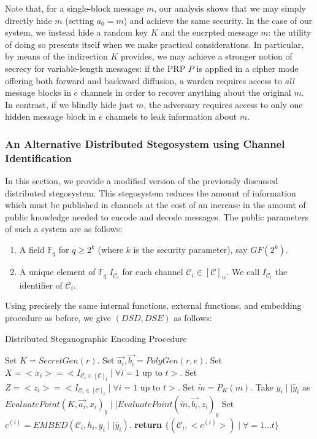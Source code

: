 \documentclass{article}
\begin{document}
Note that, for a single-block message $m$, our analysis shows that we may simply directly hide $m$ (setting $a_0 = m$) and achieve 
the same security.  In the case of our system, we instead hide a random key $K$ and the encrpted message $m$: the utility of doing so 
presents itself when we make practical considerations.  In particular, by means of the indirection $K$ provides, we may achieve a 
stronger notion of  secrecy for variable-length messages: if the PRP $P$ is applied in a cipher mode offering both forward and backward diffusion, 
a warden requires access to \textit{all} message blocks in $e$ channels in order to recover anything about the original $m$.  In contrast,
if we blindly hide just $m$, the adversary requires access to only one hidden message block in $e$ channels to leak information about $m$.

\subsubsection{An Alternative Distributed Stegosystem using Channel Identification}

In this section, we provide a modified version of the previously discussed distributed stegosystem.
This stegosystem reduces the amount of information which must be published in channels at the cost 
of an increase in the amount of public knowledge needed to encode and decode messages.
\newline\newline
The public parameters of such a system are as follows:
\begin{enumerate}
\item{A field $\mathbb{F}_q$ for $q \geq 2^k$ (where $k$ is the security parameter), say $GF(2^k)$.}
\item{A unique element of $\mathbb{F}_q$ $I_{\mathcal{C}_i}$ for each channel $\mathcal{C}_i \in [\mathcal{C}]_w$.  We call $I_{\mathcal{C}_i}$ the identifier of $\mathcal{C}_i$.}
\end{enumerate}

Using precisely the same internal functions, external functions, and embedding procedure as before, 
we give $(DSD, DSE)$ as follows:

\begin{algorithm}[H]
\caption{Distributed Steganographic Encoding Procedure}\label{1a}
\begin{algorithmic}[1]
\State Set $K = SecretGen(r)$.
\State Set $\vec{a_i}, \vec{b_i} = PolyGen(r,e)$.
\State Set $X = <x_i> = <I_{\mathcal{C}_i \in [\mathcal{C}]_t} \mid \forall i=1\text{ up to } t>$.
\State Set $Z = <z_i> = <I_{\mathcal{C}_i \in [\mathcal{C}]_t} \mid \forall i=1\text{ up to } t>$.
\State Set $\tilde{m} = P_K(m)$.
\State Take $y_i \mid \mid \tilde{y_i}$ as $EvaluatePoint(K, \vec{a_i}, x_i)_y \mid \mid EvaluatePoint(\tilde{m}, \vec{b_i}, z_i)_y$
\State Set $c^{(i)} = EMBED(\mathcal{C}_i, h_i, y_i \mid \mid \tilde{y_i})$.
\EndFor
\State \textbf{return} $\{(\mathcal{C}_i, <c^{(i)}>) \mid \forall =1...t \}$
\EndProcedure
\end{algorithmic}
\end{algorithm}
\end{document}
